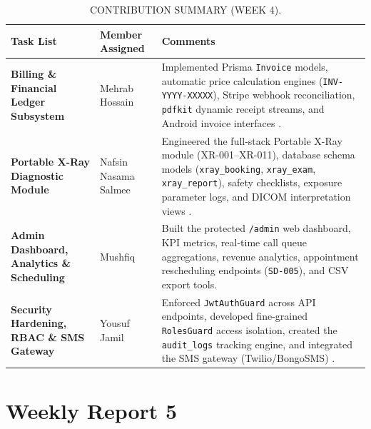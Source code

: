 \documentclass[onecolumn,journal]{IEEEtran}
\begin{document}
	\begin{table}[H]
		\centering
		\small
		\renewcommand{\arraystretch}{1.3}
		\begin{tabularx}{\textwidth}{>{\raggedright\arraybackslash}p{} >{\raggedright\arraybackslash}p{} >{\raggedright\arraybackslash}X}
			\toprule
			\textbf{Task List} & \textbf{Member Assigned} & \textbf{Comments} \\
			\midrule
			\textbf{Billing \& Financial Ledger Subsystem} & Mehrab Hossain & Implemented Prisma \texttt{Invoice} models, automatic price calculation engines (\texttt{INV-YYYY-XXXXX}), Stripe webhook reconciliation, \texttt{pdfkit} dynamic receipt streams, and Android invoice interfaces \cite{stripe2024api}. \\
			\textbf{Portable X-Ray Diagnostic Module} & Nafsin Nasama Salmee & Engineered the full-stack Portable X-Ray module (XR-001--XR-011), database schema models (\texttt{xray\_booking}, \texttt{xray\_exam}, \texttt{xray\_report}), safety checklists, exposure parameter logs, and DICOM interpretation views \cite{dicom2021}. \\
			\textbf{Admin Dashboard, Analytics \& Scheduling} & Mushfiq & Built the protected \texttt{/admin} web dashboard, KPI metrics, real-time call queue aggregations, revenue analytics, appointment rescheduling endpoints (\texttt{SD-005}), and CSV export tools. \\
			\textbf{Security Hardening, RBAC \& SMS Gateway} & Yousuf Jamil & Enforced \texttt{JwtAuthGuard} across API endpoints, developed fine-grained \texttt{RolesGuard} access isolation, created the \texttt{audit\_logs} tracking engine, and integrated the SMS gateway (Twilio/BongoSMS) \cite{jones2015jwt}. \\
			\bottomrule
		\end{tabularx}
		\vspace{8pt}
		\caption{CONTRIBUTION SUMMARY (WEEK 4).}
		\label{tab:contribution_summary_w4}
	\end{table}
	
	\section{Weekly Report 5}
	
\end{document}
